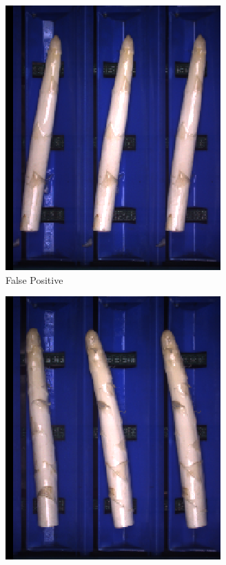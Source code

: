 \begin{figure}[h]
	\begin{subfigure}{0.3\textwidth}
		\includegraphics[width=0.9\linewidth]{Figures/appendix/rustybody_falsepositive_01.png}
		\vspace{-5pt}
		\caption{False Positive}
	\end{subfigure}
	\begin{subfigure}{0.3\textwidth}
		\includegraphics[width=0.9\linewidth]{Figures/appendix/rustybody_falsepositive_02.png}

\end{subfigure}
\end{figure}
